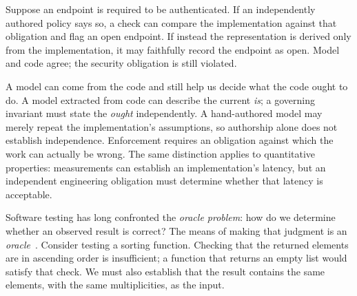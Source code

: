 




Suppose an endpoint is required to be authenticated. If an independently authored policy says so, a check can compare the implementation against that obligation and flag an open endpoint. If instead the representation is derived only from the implementation, it may faithfully record the endpoint as open. Model and code agree; the security obligation is still violated.



A model can come from the code and still help us decide what the code ought to do. A model extracted from code can describe the current \emph{is}; a governing invariant must state the \emph{ought} independently. A hand-authored model may merely repeat the implementation's assumptions, so authorship alone does not establish independence. Enforcement requires an obligation against which the work can actually be wrong. The same distinction applies to quantitative properties: measurements can establish an implementation's latency, but an independent engineering obligation must determine whether that latency is acceptable.


Software testing has long confronted the \emph{oracle problem}: how do we determine whether an observed result is correct? The means of making that judgment is an \emph{oracle}~\citep{barr2015oracle}. Consider testing a sorting function. Checking that the returned elements are in ascending order is insufficient; a function that returns an empty list would satisfy that check. We must also establish that the result contains the same elements, with the same multiplicities, as the input.

